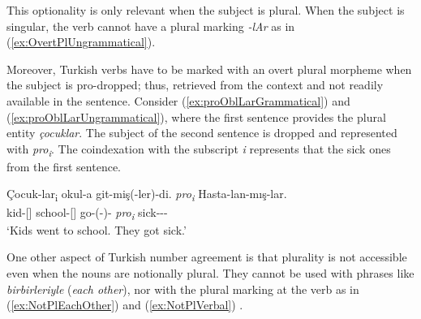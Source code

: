 This optionality is only relevant when the subject is plural. When the subject is singular, the verb cannot have a plural marking \emph{-lAr} as in (\ref{ex:OvertPlUngrammatical}).

\z

Moreover, Turkish verbs have to be marked with an overt plural morpheme when the subject is pro-dropped; thus, retrieved from the context and not readily available in the sentence. Consider (\ref{ex:proOblLarGrammatical}) and (\ref{ex:proOblLarUngrammatical}), where the first sentence provides the plural entity \textit{\c{c}ocuklar}. The subject of the second sentence is dropped and represented with \textit{pro\textsubscript{i}}. The coindexation with the subscript \emph{i} represents that the sick ones from the first sentence. 

\ea \label{ex:proObligatoryLar}
  \ea \label{ex:proOblLarGrammatical}
    \gll \c{C}ocuk-lar\textsubscript{i} okul-a git-mi\c{s}(-ler)-di. \emph{pro\textsubscript{i}} Hasta-lan-m{\i}\c{s}-lar.\\
    kid-\Pl{}[\Nom{}] school-\Dat{}[\Sg{}] go-\Evid{}(-\Pl{})-\Pst{} \emph{pro\textsubscript{i}} sick-\Vblz{}-\Evid{}-\Pl{}\\
    \glt `Kids went to school. They got\textsubscript{\Pl{}} sick.'
  \z
\z


One other aspect of Turkish number agreement is that plurality is not accessible even when the nouns are notionally plural. They cannot be used with phrases like \emph{birbirleriyle} (\emph{each other}), nor with the plural marking at the verb as in (\ref{ex:NotPlEachOther}) and (\ref{ex:NotPlVerbal}) \citep{Sag}. %

\ea \label{ex:notionalPlural}
  \z
\z



